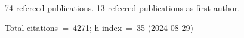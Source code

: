 74 refereed publications. 13 refeered publications as first author.

Total citations~=~4271; h-index~=~35 (2024-08-29)